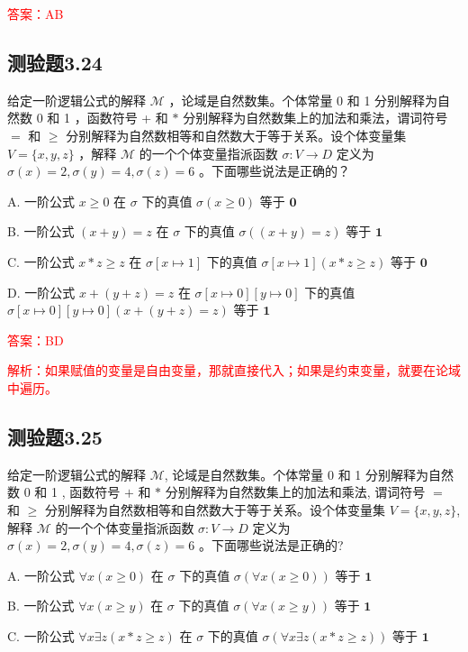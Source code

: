 \documentclass[UTF8, heading=true]{ctexart}
\begin{document}
\textcolor{red}{答案：AB}

\subsection{测验题3.24}

给定一阶逻辑公式的解释 $\mathcal{M}$ ，论域是自然数集。个体常量 0 和 1 分别解释为自然数 0 和 1 ，函数符号 + 和 $*$ 分别解释为自然数集上的加法和乘法，谓词符号 $=$ 和 $\geq$ 分别解释为自然数相等和自然数大于等于关系。设个体变量集 $V=\{x, y, z\}$ ，解释 $\mathcal{M}$ 的一个个体变量指派函数 $\sigma: V \rightarrow D$ 定义为 $\sigma(x)=2, \sigma(y)=4, \sigma(z)=6$ 。下面哪些说法是正确的？

A. 一阶公式 $x \geq 0$ 在 $\sigma$ 下的真值 $\sigma(x \geq 0)$ 等于 $\mathbf{0}$

B. 一阶公式 $(x+y)=z$ 在 $\sigma$ 下的真值 $\sigma((x+y)=z)$ 等于 $\mathbf{1}$

C. 一阶公式 $x * z \geq z$ 在 $\sigma[x \mapsto 1]$ 下的真值 $\sigma[x \mapsto 1](x * z \geq z)$ 等于 $\mathbf{0}$

D. 一阶公式 $x+(y+z)=z$ 在 $\sigma[x \mapsto 0][y \mapsto 0]$ 下的真值 $\sigma[x \mapsto 0][y \mapsto 0](x+(y+z)=z)$ 等于 $\mathbf{1}$

\textcolor{red}{答案：BD}

\textcolor{red}{解析：如果赋值的变量是自由变量，那就直接代入；如果是约束变量，就要在论域中遍历。}

\subsection{测验题3.25}

给定一阶逻辑公式的解释 $\mathcal{M}$, 论域是自然数集。个体常量 0 和 1 分别解释为自然数 0 和 1 , 函数符号 $+$ 和 $*$ 分别解释为自然数集上的加法和乘法, 谓词符号 $=$ 和 $\geq$ 分别解释为自然数相等和自然数大于等于关系。设个体变量集 $V=\{x, y, z\}$, 解释 $\mathcal{M}$ 的一个个体变量指派函数 $\sigma: V \rightarrow D$ 定义为 $\sigma(x)=2, \sigma(y)=4, \sigma(z)=6$ 。下面哪些说法是正确的?

A. 一阶公式 $\forall x(x \geq 0)$ 在 $\sigma$ 下的真值 $\sigma(\forall x(x \geq 0))$ 等于 $\mathbf{1}$

B. 一阶公式 $\forall x(x \geq y)$ 在 $\sigma$ 下的真值 $\sigma(\forall x(x \geq y))$ 等于 $\mathbf{1}$

C. 一阶公式 $\forall x \exists z(x * z \geq z)$ 在 $\sigma$ 下的真值 $\sigma(\forall x \exists z(x * z \geq z))$ 等于 $\mathbf{1}$
\end{document}
